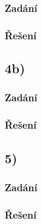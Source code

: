 \documentclass[../main.tex]{subfiles}
\begin{document}
\subsubsection*{Zadání}


\subsubsection*{Řešení}





\subsection{4b)}
\subsubsection*{Zadání}


\subsubsection*{Řešení}



\subsection{5)}
\subsubsection*{Zadání}


\subsubsection*{Řešení}
\end{document}
